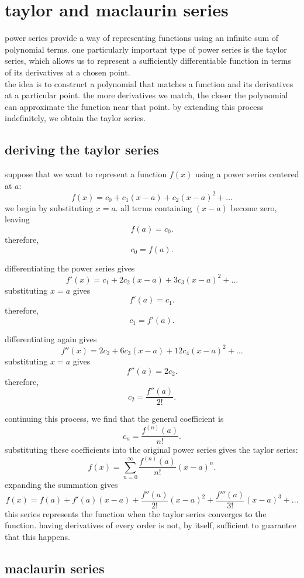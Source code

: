 \documentclass{article}
\begin{document}
\newpage

\section{taylor and maclaurin series}

power series provide a way of representing functions using an infinite sum of polynomial terms. one particularly important type of power series is the taylor series, which allows us to represent a sufficiently differentiable function in terms of its derivatives at a chosen point.\\

the idea is to construct a polynomial that matches a function and its derivatives at a particular point. the more derivatives we match, the closer the polynomial can approximate the function near that point. by extending this process indefinitely, we obtain the taylor series.\\

\subsection{deriving the taylor series}

suppose that we want to represent a function $f(x)$ using a power series centered at $a$:
\[
f(x)=c_0+c_1(x-a)+c_2(x-a)^2+\ldots
\]
we begin by substituting $x=a$. all terms containing $(x-a)$ become zero, leaving
\[
f(a)=c_0.
\]
therefore,
\[
c_0=f(a).
\]

differentiating the power series gives
\[
f'(x)=c_1+2c_2(x-a)+3c_3(x-a)^2+\ldots
\]
substituting $x=a$ gives
\[
f'(a)=c_1.
\]
therefore,
\[
c_1=f'(a).
\]

differentiating again gives
\[
f''(x)=2c_2+6c_3(x-a)+12c_4(x-a)^2+\ldots
\]
substituting $x=a$ gives
\[
f''(a)=2c_2.
\]
therefore,
\[
c_2=\frac{f''(a)}{2!}.
\]

continuing this process, we find that the general coefficient is
\[
c_n=\frac{f^{(n)}(a)}{n!}.
\]
substituting these coefficients into the original power series gives the taylor series:
\[
\boxed{
f(x)=
\sum_{n=0}^{\infty}
\frac{f^{(n)}(a)}{n!}(x-a)^n.
}
\]
expanding the summation gives
\[
f(x)=f(a)+f'(a)(x-a)
+\frac{f''(a)}{2!}(x-a)^2
+\frac{f'''(a)}{3!}(x-a)^3+\ldots
\]
this series represents the function when the taylor series converges to the function. having derivatives of every order is not, by itself, sufficient to guarantee that this happens.\\

\subsection{maclaurin series}
\end{document}
